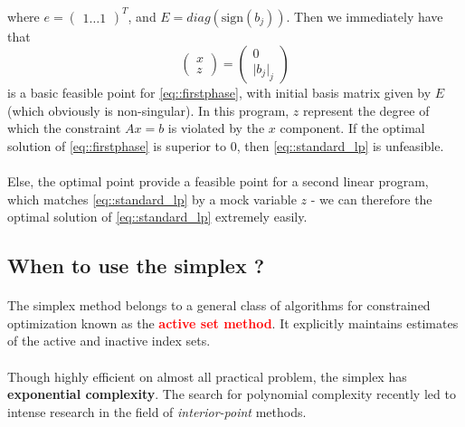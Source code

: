 \documentclass[a4paper]{article}
\newcommand\reflp{\eqref{eq::standard_lp}}
\begin{document}
{{{{				where $e = \begin{pmatrix} 1 \hdots 1\end{pmatrix}^T$, and $E = diag(\text{sign}(b_j))$. Then we immediately have that 
				$$
					\begin{pmatrix} x \\z \end{pmatrix} = \begin{pmatrix} 0 \\ \vert b_j \vert _j\end{pmatrix}
				$$
				is a basic feasible point for \eqref{eq::firstphase}, with initial basis matrix given by $E$ (which obviously is non-singular). In this program, $z$ represent the degree of which the constraint $Ax=b$ is violated by the $x$ component. If the optimal solution of \eqref{eq::firstphase} is superior to $0$, then \reflp{} is unfeasible. 
				
				\paragraph{} Else, the optimal point provide a feasible point for a second linear program, which matches \reflp{} by a mock variable $z$ - we can therefore the optimal solution of \reflp{} extremely easily. 
				
				}
				
			}
		}
		\subsection{When to use the simplex ?}
		{
			\paragraph{} The simplex method belongs to a general class of algorithms for constrained optimization known as the \textbf{\textcolor{red}{active set method}}. It explicitly maintains estimates of the active and inactive index sets. 
			
			\paragraph{} Though highly efficient on almost all practical problem, the simplex has \textbf{exponential complexity}. The search for polynomial complexity recently led to intense research in the field of \emph{interior-point} methods.
		} 
	}
\end{document}
